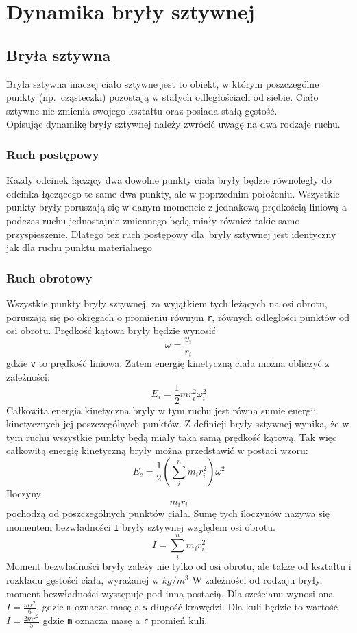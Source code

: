 \chapter{Dynamika bryły sztywnej}
\section{Bryła sztywna}
Bryła sztywna inaczej ciało sztywne jest to obiekt, w którym poszczególne punkty (np.~cząsteczki) pozostają w stałych odległościach od siebie. Ciało sztywne nie zmienia swojego kształtu oraz posiada stałą gęstość.\\
Opisując dynamikę bryły sztywnej należy zwrócić uwagę na dwa rodzaje ruchu.
\subsection{Ruch postępowy}
Każdy odcinek łączący dwa dowolne punkty ciała bryły będzie równoległy do odcinka łączącego te same dwa punkty, ale w poprzednim położeniu. Wszystkie punkty bryły poruszają się w danym momencie z jednakową prędkością liniową a podczas ruchu jednostajnie zmiennego będą miały również takie samo przyspieszenie. Dlatego też ruch postępowy dla~bryły sztywnej jest identyczny jak dla ruchu punktu materialnego
\subsection{Ruch obrotowy}
Wszystkie punkty bryły sztywnej, za wyjątkiem tych leżących na osi obrotu, poruszają się po okręgach o promieniu równym \verb$r$, równych odległości punktów od osi obrotu. Prędkość kątowa bryły będzie wynosić\begin{equation}\omega=\frac{v_i}{r_i}\end{equation}
gdzie \verb$v$ to prędkość liniowa. Zatem energię kinetyczną ciała można obliczyć z zależności:
\begin{equation}E_i=\frac{1}{2}mr_i^2\omega_i^2\end{equation}
Całkowita energia kinetyczna bryły w tym ruchu jest równa sumie energii kinetycznych jej poszczególnych punktów. Z definicji bryły sztywnej wynika, że w tym ruchu wszystkie punkty będą miały taka samą prędkość kątową. Tak więc całkowitą energię kinetyczną bryły można przedstawić w postaci wzoru:
\begin{equation}E_c=\frac{1}{2}(\sum_i^nm_ir_i^2)\omega^2\end{equation}
Iloczyny \begin{equation}m_i r_i\end{equation} pochodzą od poszczególnych punktów ciała. Sumę tych iloczynów nazywa się momentem bezwładności \verb$I$ bryły sztywnej względem osi obrotu.
\begin{equation}I=\sum_i^n m_i r_i^2\end{equation}
Moment bezwładności bryły zależy nie tylko od osi obrotu, ale także od kształtu i rozkładu gęstości ciała, wyrażanej w $kg/{m}^{3}$
W zależności od rodzaju bryły, moment bezwładności występuje pod inną postacią. Dla sześcianu wynosi ona $I=\frac{ms^2}{6}$, gdzie \verb$m$ oznacza masę a \verb$s$ długość krawędzi. Dla kuli będzie to wartość $I=\frac{2mr^2}{5}$ gdzie \verb$m$ oznacza masę a \verb$r$ promień kuli\cite{wiki2}.

